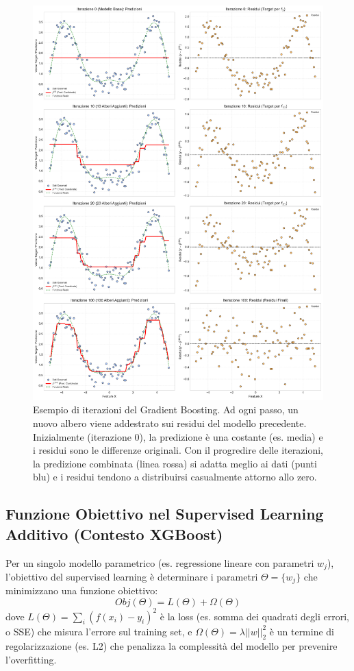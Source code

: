 \documentclass{article}
\begin{document}
\begin{figure}[H]
    \centering
    \includegraphics[width=\textwidth]{images/gbm_iterations_example.pdf}
    \caption{Esempio di iterazioni del Gradient Boosting. Ad ogni passo, un nuovo albero viene addestrato sui residui del modello precedente. Inizialmente (iterazione 0), la predizione è una costante (es. media) e i residui sono le differenze originali. Con il progredire delle iterazioni, la predizione combinata (linea rossa) si adatta meglio ai dati (punti blu) e i residui tendono a distribuirsi casualmente attorno allo zero.}
    \label{fig:gbm_iterations}
\end{figure}

\subsection{Funzione Obiettivo nel Supervised Learning Additivo (Contesto XGBoost)}
Per un singolo modello parametrico (es. regressione lineare con parametri $w_j$), l'obiettivo del supervised learning è determinare i parametri $\Theta = \{w_j\}$ che minimizzano una funzione obiettivo:
$$ Obj(\Theta) = L(\Theta) + \Omega(\Theta) $$
dove $L(\Theta) = \sum_{i} (f(x_i) - y_i)^2$ è la loss (es. somma dei quadrati degli errori, o SSE) che misura l'errore sul training set, e $\Omega(\Theta) = \lambda ||w||_2^2$ è un termine di regolarizzazione (es. L2) che penalizza la complessità del modello per prevenire l'overfitting.
\end{document}

